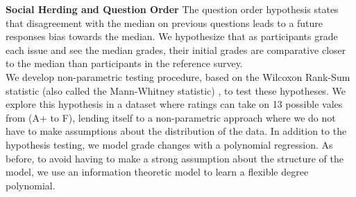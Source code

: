 \noindent \textbf{Social Herding and Question Order} The question order hypothesis states that disagreement with the median on previous questions leads to a future responses bias towards the median. We hypothesize that as participants grade each issue and see the median grades, their initial grades are comparative closer to the median than participants in the reference survey.\\[1\baselineskip]
We develop non-parametric testing procedure, based on the Wilcoxon Rank-Sum statistic (also called the Mann-Whitney statistic) \cite{lehmann2006nonparametrics}, to test these hypotheses.
We explore this hypothesis in a dataset where ratings can take on 13 possible vales from (A+ to F), lending itself to a non-parametric approach where we do not have to make assumptions about the distribution of the data.
In addition to the hypothesis testing, we model grade changes with a polynomial regression.
As before, to avoid having to make a strong assumption about the structure of the model, we use an information theoretic model to learn a flexible degree polynomial.

